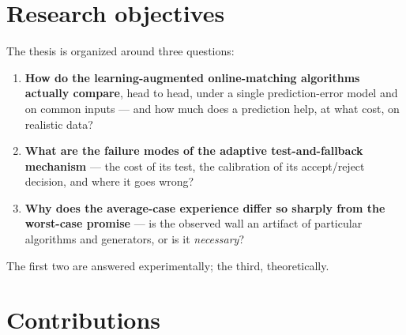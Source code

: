 \section{Research objectives}\label{research-objectives}

The thesis is organized around three questions:

\begin{enumerate}
\def\labelenumi{\arabic{enumi}.}
\tightlist
\item
  \textbf{How do the learning-augmented online-matching algorithms actually compare}, head to
  head, under a single prediction-error model and on common inputs --- and how much does a
  prediction help, at what cost, on realistic data?
\item
  \textbf{What are the failure modes of the adaptive test-and-fallback mechanism} --- the cost of
  its test, the calibration of its accept/reject decision, and where it goes wrong?
\item
  \textbf{Why does the average-case experience differ so sharply from the worst-case promise} ---
  is the observed wall an artifact of particular algorithms and generators, or is it
  \emph{necessary}?
\end{enumerate}

The first two are answered experimentally; the third, theoretically.

\section{Contributions}\label{contributions}


